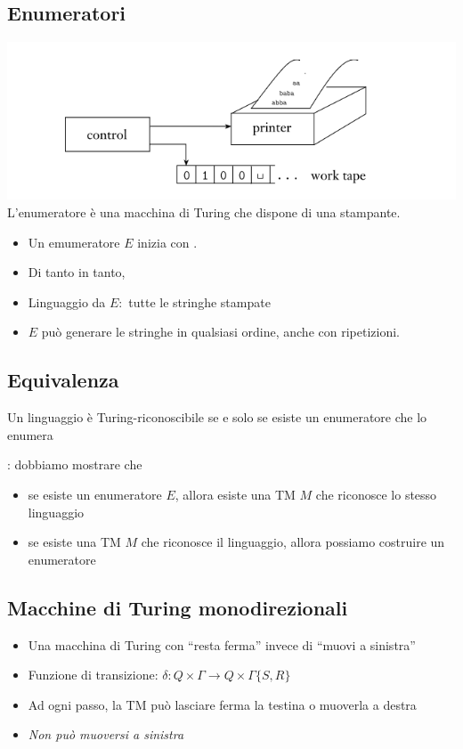 \subsection{Enumeratori}
\includegraphics[scale=0.5]{img/enumeratore.png}\\
L'enumeratore è una macchina di Turing che dispone di una stampante.
\begin{itemize}
   \item Un emumeratore $E$ inizia con .
   \item Di tanto in tanto,  
   \item Linguaggio  da $E:$ tutte le stringhe stampate
   \item $E$ può generare le stringhe in qualsiasi ordine, anche con ripetizioni. 
\end{itemize}

\subsection{Equivalenza}
\begin{theorem}
   Un linguaggio è Turing-riconoscibile se e solo se esiste un enumeratore che lo enumera
\end{theorem}
: dobbiamo mostrare che 
\begin{itemize}
   \item se esiste un enumeratore $E$, allora esiste una TM $M$ che riconosce lo stesso linguaggio 
   \item se esiste una TM $M$ che riconosce il linguaggio, allora possiamo costruire un enumeratore
\end{itemize}

\subsection{Macchine di Turing monodirezionali}
\begin{itemize}
   \item Una macchina di Turing con ``resta ferma'' invece di ``muovi a sinistra''
   \item Funzione di transizione: $\delta : Q\times\Gamma\rightarrow Q\times\Gamma\{S,R\}$ 
   \item Ad ogni passo, la TM può lasciare ferma la testina o muoverla a destra
   \item \textit{Non può muoversi a sinistra}
\end{itemize}

